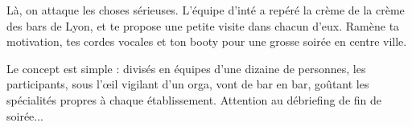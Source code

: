 Là, on attaque les choses sérieuses. L'équipe d'inté a repéré la crème de la
crème des bars de Lyon, et te propose une petite visite dans chacun
d'eux. Ramène ta motivation, tes cordes vocales et ton booty pour une grosse
soirée en centre ville.

Le concept est simple : divisés en équipes d'une dizaine de personnes, les
participants, sous l'œil vigilant d'un orga, vont de bar en bar, goûtant les
spécialités propres à chaque établissement. Attention au débriefing de fin de soirée...
